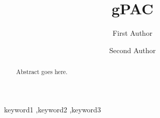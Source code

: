 \documentclass[preprint,12pt]{elsarticle}
\begin{document}
\begin{frontmatter}
    \title{gPAC}
    
    \author{First Author}
    \author{Second Author}
    
    \begin{abstract}
    Abstract goes here.
    \end{abstract}
    
    \begin{keyword}
    keyword1 \sep keyword2 \sep keyword3
    \end{keyword}
\end{frontmatter}







\end{document}
